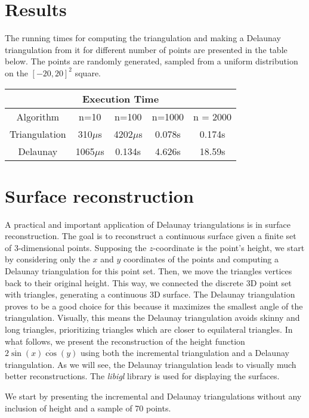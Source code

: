 \documentclass[a4paper, 10pt, conference]{ieeeconf}      %
\begin{document}
\section{Results}

The running times for computing the triangulation and making a Delaunay triangulation from it for different number of points are presented in the table below.
The points are randomly generated, sampled from a uniform distribution on the $[-20,20]^2$ square. 

\begin{center}
 \begin{tabular}{||c c c c c ||} 
 \hline 
  \multicolumn{5}{|c|}{Execution Time} \\
 \hline
 Algorithm & n=10 & n=100 & n=1000 & n = 2000\\
 \hline
 Triangulation & 310$\mu$s & 4202$\mu$s & 0.078s & 0.174s \\ 
 \hline
 Delaunay & 1065$\mu$s & 0.134s & 4.626s & 18.59s \\
 \hline
\end{tabular}
\end{center}

\section{Surface reconstruction}
A practical and important application of Delaunay triangulations is in surface reconstruction.
The goal is to reconstruct a continuous surface given a finite set of 3-dimensional points.
Supposing the $z$-coordinate is the point's height, we start by considering only the $x$ and $y$ coordinates of the points and computing a Delaunay triangulation for this point set.
Then, we move the triangles vertices back to their original height.
This way, we connected the discrete 3D point set with triangles, generating a continuous 3D surface.
The Delaunay triangulation proves to be a good choice for this because it maximizes the smallest angle of the triangulation.
Visually, this means the Delaunay triangulation avoids skinny and long triangles, prioritizing triangles which are closer to equilateral triangles.
In what follows, we present the reconstruction of the height function $2 \dot \sin(x) \dot \cos(y)$ using both the incremental triangulation and a Delaunay triangulation.
As we will see, the Delaunay triangulation leads to visually much better reconstructions.
The \textit{libigl} library is used for displaying the surfaces.

We start by presenting the incremental and Delaunay triangulations without any inclusion of height and a sample of 70 points.
\end{document}
